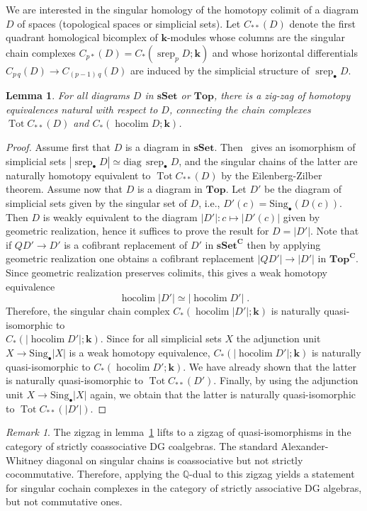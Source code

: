 \documentclass{amsart}
\newtheorem{lemma}[formula]{Lemma}
\theoremstyle{definition}
\theoremstyle{remark}
\newtheorem{remark}[formula]{Remark}
\newcommand{\Q}{\mathbb Q}
\DeclareMathOperator{\hoc}{hocolim}
\DeclareMathOperator{\srep}{srep}
\DeclareMathOperator{\Tot}{Tot}
\newcommand{\Cc}{\mathbf{C}}
\newcommand{\sset}{\mathbf{sSet}}
\renewcommand{\top}{\mathbf{Top}}
\def\k{\mathbf{k}}
\begin{document}
We are interested in the singular homology of the homotopy colimit of a diagram $D$ of spaces (topological spaces or simplicial sets). Let $C_{**}(D)$ denote the first quadrant homological bicomplex of $\k$-modules whose columns are the singular chain complexes $C_{p*}(D) = C_*(\srep_pD;\k)$ and whose horizontal differentials $C_{p\,q}(D)\to C_{(p-1)\,q}(D)$ are induced by the simplicial structure of $\srep_\bullet D$.
\begin{lemma}\label{lm:abut}
	For all diagrams $D$ in $\sset$ or $\top$, there is a zig-zag of homotopy equivalences natural with respect to $D$, connecting the chain complexes $\Tot C_{**}(D)$ and $C_*(\hoc D;\k)$.
\end{lemma}
\begin{proof}
	Assume first that $D$ is a diagram in $\sset$. Then~\cite[Theorem~15.11.6]{hi-03} gives an isomorphism of simplicial sets $|\srep_\bullet D|\simeq \mathrm{diag}\,\srep_\bullet D$, and the singular chains of the latter are naturally homotopy equivalent to $\Tot C_{**}(D)$ by the Eilenberg-Zilber theorem. Assume now that $D$ is a diagram in $\top$. Let $D'$ be the diagram of simplicial sets given by the singular set of $D$, i.e., $D'(c)=\mathrm{Sing}_\bullet(D(c))$. Then $D$ is weakly equivalent to the diagram $|D'|\colon c\mapsto |D'(c)|$ given by geometric realization, hence it suffices to prove the result for $D=|D'|$. Note that if $QD'\to D'$ is a cofibrant replacement of $D'$ in $\sset^\Cc$ then by applying geometric realization one obtains a cofibrant replacement $|QD'|\to |D'|$ in $\top^\Cc$. Since geometric realization preserves colimits, this gives a weak homotopy equivalence
	\[
		\hoc |D'|\simeq |\hoc D'|\;.
	\]
	Therefore, the singular chain complex $C_*(\hoc |D'|;\k)$ is 
	naturally quasi-isomorphic to\\ $C_*(|\hoc D'|;\k)$. Since for all simplicial sets $X$ the adjunction unit $X\to \mathrm{Sing}_\bullet |X|$ is a weak homotopy equivalence, $C_*(|\hoc D'|;\k)$ is naturally quasi-isomorphic to $C_*(\hoc D';\k)$. We have already shown that the latter is naturally 
	quasi-isomorphic to $\Tot C_{**}(D')$. Finally, by using the adjunction unit  $X\to \mathrm{Sing}_\bullet |X|$ again, we obtain that the latter is naturally quasi-isomorphic to $\Tot C_{**}(|D'|)$.
\end{proof}

\begin{remark}\label{rem:upzigzag}
The zigzag in lemma~\ref{lm:abut} lifts to a zigzag of quasi-isomorphisms in the category of strictly coassociative DG coalgebras. 
The standard Alexander-Whitney diagonal on singular chains is coassociative but not strictly cocommutative. 
Therefore, applying the $\Q$-dual to this zigzag yields a statement for singular cochain complexes in the category of strictly associative DG algebras, but not commutative ones. 
\end{remark}
\end{document}
